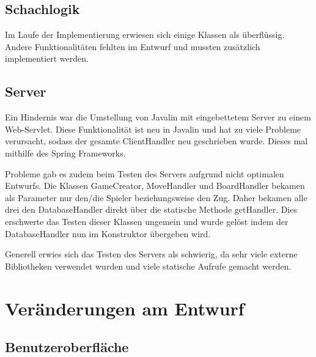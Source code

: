 \documentclass[parskip=full]{scrartcl}
\begin{document}
		\subsection{Schachlogik}
		Im Laufe der Implementierung erwiesen sich einige Klassen als überflüssig. Andere Funktionalitäten fehlten im Entwurf und mussten zusätzlich implementiert werden.
		
		\subsection{Server}
		Ein Hindernis war die Umstellung von Javalin mit eingebettetem Server zu einem Web-Servlet. Diese Funktionalität ist neu in Javalin und hat zu viele Probleme verursacht, sodass der gesamte ClientHandler neu geschrieben wurde.
		Dieses mal mithilfe des Spring Frameworks.	
		
		Probleme gab es zudem beim Testen des Servers aufgrund nicht optimalen Entwurfs.
		Die Klassen GameCreator, MoveHandler und BoardHandler bekamen als Parameter nur den/die Spieler beziehungsweise den Zug. Daher bekamen alle drei den DatabaseHandler direkt über die statische Methode getHandler. Dies erschwerte das Testen dieser Klassen ungemein und wurde gelöst indem der DatabaseHandler nun im Konstruktor übergeben wird.
		
		Generell erwies sich das Testen des Servers als schwierig, da sehr viele externe Bibliotheken verwendet wurden und viele statische Aufrufe gemacht werden.
		\section{Veränderungen am Entwurf}
		
		\subsection{Benutzeroberfläche}	
		
\end{document}
